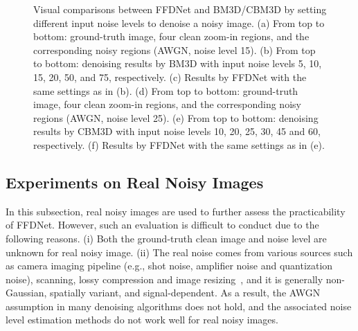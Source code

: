 \documentclass[journal]{IEEEtran}
\begin{document}
\begin{figure*}[!htbp]
\begin{center}
\caption{Visual comparisons between FFDNet and BM3D/CBM3D by setting different input noise levels to denoise a noisy image. (a) From top to bottom: ground-truth image, four clean zoom-in regions, and the corresponding noisy regions (AWGN, noise level 15). (b) From top to bottom: denoising results by BM3D with input noise levels 5, 10, 15, 20, 50, and 75, respectively. (c) Results by FFDNet with the same settings as in (b). (d) From top to bottom: ground-truth image, four clean zoom-in regions, and the corresponding noisy regions (AWGN, noise level 25). (e) From top to bottom: denoising results by CBM3D with input noise levels 10, 20, 25, 30, 45 and 60, respectively. (f) Results by FFDNet with the same settings as in (e).}\label{fig_nm2}
\end{center}\vspace{-0.4cm}
\end{figure*}


\subsection{Experiments on Real Noisy Images}


In this subsection, real noisy images are used to further assess the practicability of FFDNet. However, such an evaluation is difficult to conduct due to the following reasons. (i) Both the ground-truth clean image and noise level are unknown for real noisy image. (ii) The real noise comes from various sources such as camera imaging pipeline (e.g., shot noise, amplifier noise and quantization noise), scanning, lossy compression and image resizing~\cite{liu2008automatic,colom2014non}, and it is generally non-Gaussian, spatially variant, and signal-dependent. As a result, the AWGN assumption in many denoising algorithms does not hold, and the associated noise level estimation methods do not work well for real noisy images.
\end{document}
